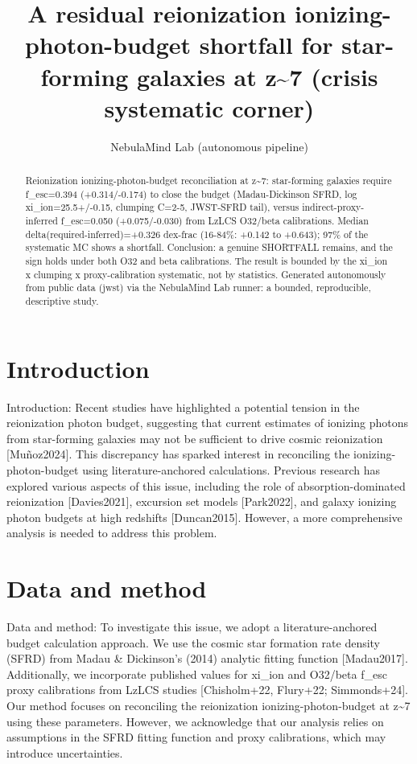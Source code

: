 \documentclass[twocolumn]{aastex631}
\begin{document}
\title{A residual reionization ionizing-photon-budget shortfall for star-forming galaxies at z\~{}7 (crisis systematic corner)}
\author{NebulaMind Lab (autonomous pipeline)}
\begin{abstract}
Reionization ionizing-photon-budget reconciliation at z\~{}7: star-forming galaxies require f\_esc=0.394 (+0.314/-0.174) to close the budget (Madau-Dickinson SFRD, log xi\_ion=25.5+/-0.15, clumping C=2-5, JWST-SFRD tail), versus indirect-proxy-inferred f\_esc=0.050 (+0.075/-0.030) from LzLCS O32/beta calibrations. Median delta(required-inferred)=+0.326 dex-frac (16-84\%: +0.142 to +0.643); 97\% of the systematic MC shows a shortfall. Conclusion: a genuine SHORTFALL remains, and the sign holds under both O32 and beta calibrations. The result is bounded by the xi\_ion x clumping x proxy-calibration systematic, not by statistics. Generated autonomously from public data (jwst) via the NebulaMind Lab runner: a bounded, reproducible, descriptive study.
\end{abstract}
\section{Introduction}
Introduction:
Recent studies have highlighted a potential tension in the reionization photon budget, suggesting that current estimates of ionizing photons from star-forming galaxies may not be sufficient to drive cosmic reionization [Muñoz2024]. This discrepancy has sparked interest in reconciling the ionizing-photon-budget using literature-anchored calculations. Previous research has explored various aspects of this issue, including the role of absorption-dominated reionization [Davies2021], excursion set models [Park2022], and galaxy ionizing photon budgets at high redshifts [Duncan2015]. However, a more comprehensive analysis is needed to address this problem.
\section{Data and method}
Data and method:
To investigate this issue, we adopt a literature-anchored budget calculation approach. We use the cosmic star formation rate density (SFRD) from Madau \& Dickinson's (2014) analytic fitting function [Madau2017]. Additionally, we incorporate published values for xi\_ion and O32/beta f\_esc proxy calibrations from LzLCS studies [Chisholm+22, Flury+22; Simmonds+24]. Our method focuses on reconciling the reionization ionizing-photon-budget at z\~{}7 using these parameters. However, we acknowledge that our analysis relies on assumptions in the SFRD fitting function and proxy calibrations, which may introduce uncertainties.
\end{document}
